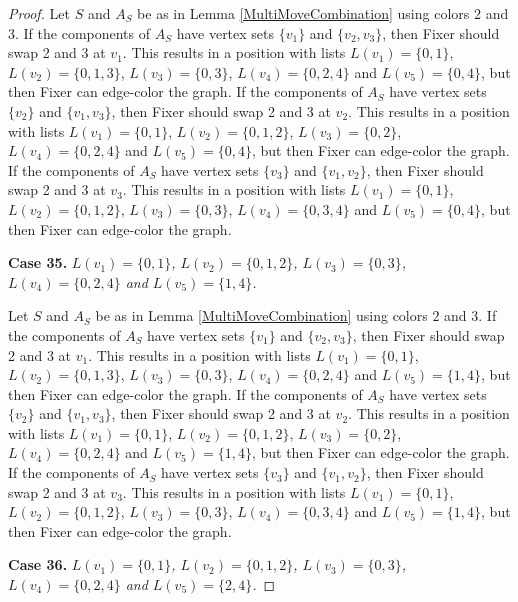 \documentclass[12pt]{amsart}
\theoremstyle{plain}
\theoremstyle{definition}
\theoremstyle{remark}
\begin{document}
\begin{proof}
Let $S$ and $A_S$ be as in Lemma \ref{MultiMoveCombination} using colors $2$ and $3$. If the components of $A_S$ have vertex sets $\{v_1\}$ and $\{v_2, v_3\}$, then Fixer should swap 2 and 3 at $v_1$. This results in a position with lists $L(v_1) = \{0, 1\}$, $L(v_2) = \{0, 1, 3\}$, $L(v_3) = \{0, 3\}$, $L(v_4) = \{0, 2, 4\}$ and $L(v_5) = \{0, 4\}$, but then Fixer can edge-color the graph.
If the components of $A_S$ have vertex sets $\{v_2\}$ and $\{v_1, v_3\}$, then Fixer should swap 2 and 3 at $v_2$. This results in a position with lists $L(v_1) = \{0, 1\}$, $L(v_2) = \{0, 1, 2\}$, $L(v_3) = \{0, 2\}$, $L(v_4) = \{0, 2, 4\}$ and $L(v_5) = \{0, 4\}$, but then Fixer can edge-color the graph.
If the components of $A_S$ have vertex sets $\{v_3\}$ and $\{v_1, v_2\}$, then Fixer should swap 2 and 3 at $v_3$. This results in a position with lists $L(v_1) = \{0, 1\}$, $L(v_2) = \{0, 1, 2\}$, $L(v_3) = \{0, 3\}$, $L(v_4) = \{0, 3, 4\}$ and $L(v_5) = \{0, 4\}$, but then Fixer can edge-color the graph.

\noindent\textbf{Case 35.  }\textit{$L(v_1) = \{0, 1\}$, $L(v_2) = \{0, 1, 2\}$, $L(v_3) = \{0, 3\}$, $L(v_4) = \{0, 2, 4\}$ and $L(v_5) = \{1, 4\}$.}

Let $S$ and $A_S$ be as in Lemma \ref{MultiMoveCombination} using colors $2$ and $3$. If the components of $A_S$ have vertex sets $\{v_1\}$ and $\{v_2, v_3\}$, then Fixer should swap 2 and 3 at $v_1$. This results in a position with lists $L(v_1) = \{0, 1\}$, $L(v_2) = \{0, 1, 3\}$, $L(v_3) = \{0, 3\}$, $L(v_4) = \{0, 2, 4\}$ and $L(v_5) = \{1, 4\}$, but then Fixer can edge-color the graph.
If the components of $A_S$ have vertex sets $\{v_2\}$ and $\{v_1, v_3\}$, then Fixer should swap 2 and 3 at $v_2$. This results in a position with lists $L(v_1) = \{0, 1\}$, $L(v_2) = \{0, 1, 2\}$, $L(v_3) = \{0, 2\}$, $L(v_4) = \{0, 2, 4\}$ and $L(v_5) = \{1, 4\}$, but then Fixer can edge-color the graph.
If the components of $A_S$ have vertex sets $\{v_3\}$ and $\{v_1, v_2\}$, then Fixer should swap 2 and 3 at $v_3$. This results in a position with lists $L(v_1) = \{0, 1\}$, $L(v_2) = \{0, 1, 2\}$, $L(v_3) = \{0, 3\}$, $L(v_4) = \{0, 3, 4\}$ and $L(v_5) = \{1, 4\}$, but then Fixer can edge-color the graph.

\noindent\textbf{Case 36.  }\textit{$L(v_1) = \{0, 1\}$, $L(v_2) = \{0, 1, 2\}$, $L(v_3) = \{0, 3\}$, $L(v_4) = \{0, 2, 4\}$ and $L(v_5) = \{2, 4\}$.}


\end{proof}
\end{document}
